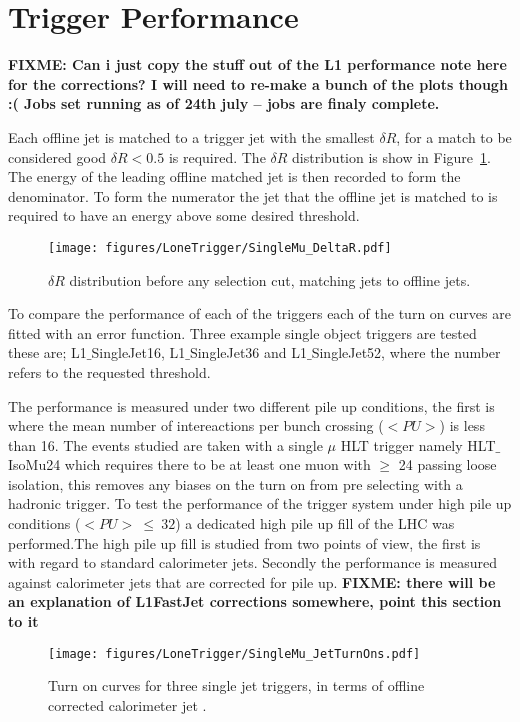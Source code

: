 \section{\Lone Trigger Performance} %
\label{sec:lone_trigger_performance}
\textbf{FIXME: Can i just copy the stuff out of the L1 performance note here 
for the corrections? I will need to re-make a bunch of the plots though :( Jobs 
set running as of 24th july -- jobs are finaly complete.}


Each offline jet is matched to a \Lone trigger jet with the smallest $\delta 
R$, for a match to be considered good $\delta R < 0.5$ is required. The $\delta 
R$ distribution is show in Figure~\ref{fig:figures_LoneTrigger_SingleMu_DeltaR}.
The energy of the leading offline matched jet is then recorded to form the 
denominator. To form the numerator the \Lone jet that the offline jet is 
matched to is required to have an energy above some desired threshold.

\begin{figure}[ht!]
  \centering
    \texttt{[image: figures/LoneTrigger/SingleMu\_DeltaR.pdf]}
  \caption{$\delta R$ distribution before any selection cut, matching \Lone 
  jets to offline jets.}
  \label{fig:figures_LoneTrigger_SingleMu_DeltaR}
\end{figure}


To compare the performance of each of the triggers each of the turn on curves
are fitted with an error function. Three example single object triggers are 
tested these are; L1$\_$SingleJet16, L1$\_$SingleJet36 and L1$\_$SingleJet52, 
where the number refers to the requested \ET threshold.

The performance is measured under two different pile up conditions, the first
is where the mean number of intereactions per bunch crossing ($<PU>$) is less 
than 16. The events studied are taken with a single $\mu$ HLT trigger namely
HLT$\_$IsoMu24 which requires there to be at least one muon with \PT $\geq$ 24 
\GeV passing loose isolation, this removes any biases on the turn on from pre 
selecting with a hadronic trigger. To test the performance of the trigger 
system under high pile up conditions ($<PU> ~ \leq ~ 32$) a dedicated high pile 
up fill of the LHC was performed.The high pile up fill is studied from two 
points of view, the first is with regard to standard \AK calorimeter jets. 
Secondly the performance is measured against \AK calorimeter jets that are 
corrected for pile up.
\textbf{FIXME: there will be an explanation of L1FastJet corrections somewhere, 
point this section to it}
\begin{figure}[ht]
  \centering
    \texttt{[image: figures/LoneTrigger/SingleMu\_JetTurnOns.pdf]}
  \caption{Turn on curves for three \Lone single jet triggers, in terms of 
  offline corrected \AK calorimeter jet \ET.}
  \label{fig:figures_LoneTrigger_SingleMu_JetTurnOns}
\end{figure}

